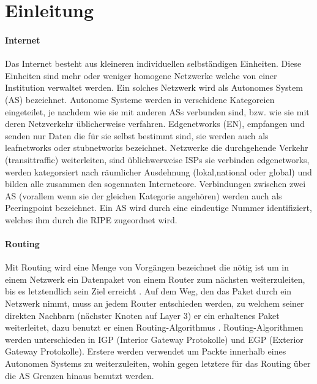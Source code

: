 \section{Einleitung}


\paragraph{Internet}
Das Internet besteht aus kleineren individuellen selbständigen Einheiten. Diese Einheiten sind mehr oder weniger homogene Netzwerke welche von einer Institution verwaltet werden. Ein solches Netzwerk wird als Autonomes System (AS) bezeichnet. Autonome Systeme werden in verschidene Kategoreien eingeteilet, je nachdem wie sie mit anderen ASs verbunden sind, bzw. wie sie mit deren Netzverkehr üblicherweise verfahren. Edgenetworks (EN), empfangen und senden nur Daten die für sie selbst bestimmt sind, sie werden auch als leafnetworks oder stubnetworks bezeichnet. Netzwerke die durchgehende Verkehr (transittraffic) weiterleiten, sind üblichwerweise ISPs sie verbinden edgenetworks, werden kategorsiert nach räumlicher Ausdehnung (lokal,national oder global) und bilden alle zusammen den sogennaten Internetcore. Verbindungen zwischen zwei AS (vorallem wenn sie der gleichen Kategorie angehören) werden auch als Peeringpoint bezeichnet. Ein AS wird durch eine eindeutige Nummer identifiziert, welches ihm durch die RIPE zugeordnet wird.

\paragraph{Routing}
Mit Routing wird eine Menge von Vorgängen bezeichnet die nötig ist um in einem Netzwerk ein Datenpaket von einem Router zum nächsten weiterzuleiten, bis es letztendlich sein Ziel erreicht \cite{Mahorta:2002:IR}. Auf dem Weg, den das Paket durch ein Netzwerk nimmt, muss an jedem Router entschieden werden, zu welchem seiner direkten Nachbarn (nächster Knoten auf Layer 3) er ein erhaltenes Paket weiterleitet, dazu benutzt er einen Routing-Algorithmus \cite{Tanenbaum:2003:CN}. Routing-Algorithmen werden unterschieden in IGP (Interior Gateway Protokolle) und EGP (Exterior Gateway Protokolle). Erstere werden verwendet um Packte innerhalb eines Autonomen Systems zu weiterzuleiten, wohin gegen letztere für das Routing über die AS Grenzen hinaus benutzt werden. 


